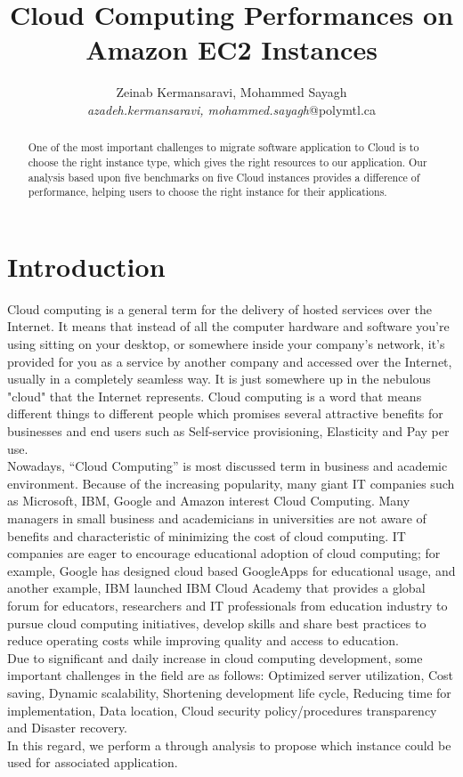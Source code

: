 \documentclass[10pt, conference]{IEEEtran}
\title{Cloud Computing Performances on Amazon EC2 Instances}
\author{Zeinab Kermansaravi, Mohammed Sayagh
    \\
    \emph{azadeh.kermansaravi, mohammed.sayagh}@polymtl.ca}
\begin{document}
\maketitle

\begin{abstract}
One of the most important challenges to migrate software application to Cloud is to choose the right instance type, which gives the right resources to our application. Our analysis based upon five benchmarks on five Cloud instances provides a difference of performance, helping users to choose the right instance for their applications. 
\end{abstract}

\section{Introduction}
\label{sec:introduction}


\indent Cloud computing is a general term for the delivery of hosted services over the Internet. It means that instead of all the computer hardware and software you're using sitting on your desktop, or somewhere inside your company's network, it's provided for you as a service by another company and accessed over the Internet, usually in a completely seamless way. It is just somewhere up in the nebulous "cloud" that the Internet represents. Cloud computing is a word that means different things to different people which promises several attractive benefits for businesses and end users such as Self-service provisioning, Elasticity and Pay per use.\\
\indent Nowadays, “Cloud Computing” is most discussed term in business and academic environment. Because of the increasing popularity, many giant IT companies such as Microsoft, IBM, Google and Amazon interest Cloud Computing. Many managers in small business and academicians in universities are not aware of benefits and characteristic of minimizing the cost of cloud computing. IT companies are eager to encourage educational adoption of cloud computing; for example, Google has designed cloud based GoogleApps for educational usage, and another example, IBM launched IBM Cloud Academy that provides a global forum for educators, researchers and IT professionals from education industry to pursue cloud computing initiatives, develop skills and share best practices to reduce operating costs while improving quality and access to education.\\
\indent Due to significant and daily increase in cloud computing development, some important challenges in the field are as follows: Optimized server utilization, Cost saving, Dynamic scalability, Shortening development life cycle, Reducing time for implementation, Data location, Cloud security policy/procedures transparency and Disaster recovery.\\
\indent In this regard, we perform a through analysis to propose which instance could be used for associated application.
\end{document}
